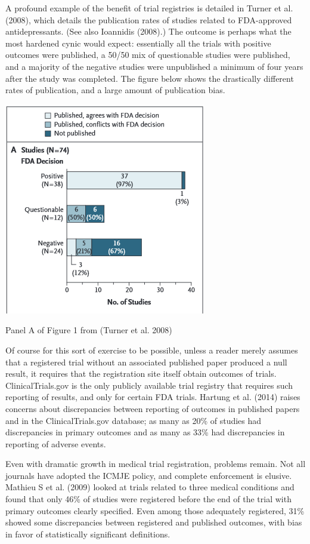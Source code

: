 \documentclass[12pt] {article}
\begin{document}
A profound example of the benefit of trial registries is detailed in
Turner et al. (2008), which details the publication rates of studies
related to FDA-approved antidepressants. (See also Ioannidis (2008).)
The outcome is perhaps what the most hardened cynic would expect:
essentially all the trials with positive outcomes were published, a
50/50 mix of questionable studies were published, and a majority of the
negative studies were unpublished a minimum of four years after the
study was completed. The figure below shows the drastically different
rates of publication, and a large amount of publication bias.
\begin{center}
\includegraphics{TurnerFigure1.PNG}

Panel A of Figure 1 from (Turner et al. 2008)
\end{center}
Of course for this sort of exercise to be possible, unless a reader
merely assumes that a registered trial without an associated published
paper produced a null result, it requires that the registration site
itself obtain outcomes of trials. ClinicalTrials.gov is the only
publicly available trial registry that requires such reporting of
results, and only for certain FDA trials. Hartung et al. (2014) raises
concerns about discrepancies between reporting of outcomes in published
papers and in the ClinicalTrials.gov database; as many as 20\% of
studies had discrepancies in primary outcomes and as many as 33\% had
discrepancies in reporting of adverse events.

Even with dramatic growth in medical trial registration, problems
remain. Not all journals have adopted the ICMJE policy, and complete
enforcement is elusive. Mathieu S et al. (2009) looked at trials related
to three medical conditions and found that only 46\% of studies were
registered before the end of the trial with primary outcomes clearly
specified. Even among those adequately registered, 31\% showed some
discrepancies between registered and published outcomes, with bias in
favor of statistically significant definitions.
\end{document}
